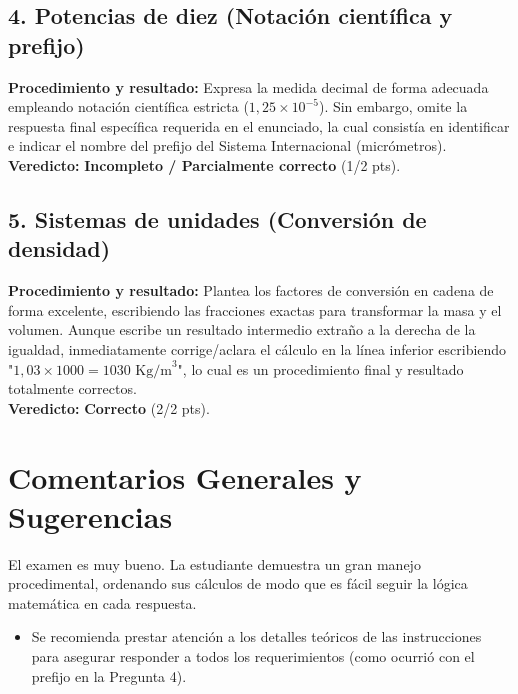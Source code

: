 \documentclass[12pt]{article}
\begin{document}
\subsection*{4. Potencias de diez (Notación científica y prefijo)}
\textbf{Procedimiento y resultado:} Expresa la medida decimal de forma adecuada empleando notación científica estricta ($1,25 \times 10^{-5}$). Sin embargo, omite la respuesta final específica requerida en el enunciado, la cual consistía en identificar e indicar el nombre del prefijo del Sistema Internacional (micrómetros). \\
\textbf{Veredicto:} \textbf{Incompleto / Parcialmente correcto} (1/2 pts).

\subsection*{5. Sistemas de unidades (Conversión de densidad)}
\textbf{Procedimiento y resultado:} Plantea los factores de conversión en cadena de forma excelente, escribiendo las fracciones exactas para transformar la masa y el volumen. Aunque escribe un resultado intermedio extraño a la derecha de la igualdad, inmediatamente corrige/aclara el cálculo en la línea inferior escribiendo "$1,03 \times 1000 = 1030 \text{ Kg/m}^3$", lo cual es un procedimiento final y resultado totalmente correctos. \\
\textbf{Veredicto:} \textbf{Correcto} (2/2 pts).

\vspace{0.5cm}
\section*{Comentarios Generales y Sugerencias}
El examen es muy bueno. La estudiante demuestra un gran manejo procedimental, ordenando sus cálculos de modo que es fácil seguir la lógica matemática en cada respuesta. 
\begin{itemize}
    \item Se recomienda prestar atención a los detalles teóricos de las instrucciones para asegurar responder a todos los requerimientos (como ocurrió con el prefijo en la Pregunta 4).
\end{itemize}
\end{document}
